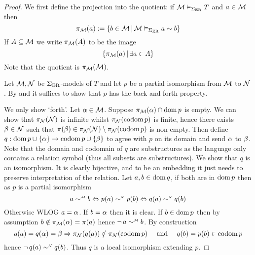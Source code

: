 \begin{proof}
    We first define the projection into the quotient:
    if $\mathcal{M} \vDash_{\Sigma_{\mathrm{ER}}} T$ and $a \in {\mathcal{M}}$ then 
    \[\pi_{\mathcal{M}}(a) := \left\{b \in {\mathcal{M}} \,|\, \mathcal{M} \vDash_{\Sigma_{\mathrm{ER}}} a \sim b\right\}\]
    If $A \subseteq \mathcal{M}$ we write $\pi_{\mathcal{M}}(A)$ to be the image
    \[\left\{\pi_{\mathcal{M}}(a) \,|\, \exists a \in A\right\}\]
    Note that the quotient is $\pi_{\mathcal{M}}(\mathcal{M})$.

    Let $\mathcal{M}, \mathcal{N}$ be $\Sigma_{\mathrm{ER}}$-models of $T$
    and let $p$ be a partial isomorphism from $\mathcal{M}$ to $\mathcal{N}$.
    By  and 
    it suffices to show that $p$ has the back and forth property.
    
    We only show `forth'.
    Let $\alpha \in \mathcal{M}$.
    Suppose $\pi_{\mathcal{M}}(\alpha) \cap \operatorname{dom} p$ is empty.
    We can show that $\pi_{\mathcal{N}}(\mathcal{N})$ is infinite whilst 
    $\pi_{\mathcal{N}}(\operatorname{codom} p)$ is finite, 
    hence there exists $\beta \in \mathcal{N}$ such that 
    $\pi(\beta) \in \pi_{\mathcal{N}}(\mathcal{N}) \setminus \pi_{\mathcal{N}}(\operatorname{codom} p)$ is non-empty.
    Then define $q : \operatorname{dom} p \cup \left\{\alpha\right\} \to \operatorname{codom} p \cup \left\{\beta\right\}$
    to agree with $p$ on its domain and send $\alpha$ to $\beta$.
    Note that the domain and codomain of $q$ are substructures
    as the language only contains a relation symbol 
    (thus all subsets are substructures).
    We show that $q$ is an isomorphism.
    It is clearly bijective, and to be an embedding it just needs to preserve
    interpretation of the relation.
    Let $a,b \in \operatorname{dom} q$, if 
    both are in $\operatorname{dom} p$ then as $p$ is a partial isomorphism
    \[a \modintp{\MM}{\sim} b \iff p(a) \modintp{\NN}{\sim} p(b) \iff 
    q(a) \nnintp{\sim} q(b)\]
    Otherwise WLOG $a = \alpha$.
    If $b = \alpha$ then it is clear.
    If $b \in \operatorname{dom} p$ then by assumption $b \notin \pi_{\mathcal{M}}(\alpha) = \pi(a)$
    hence $\NOT a \mmintp{\sim} b$.
    By construction 
    \[q(a) = q(\alpha) = \beta \Rightarrow 
    \pi_{\mathcal{N}}(q(a)) \notin \pi_{\mathcal{N}}(\operatorname{codom} p) \quad \text{ and } \quad
    q(b) = p(b) \in \operatorname{codom} p\]
    hence $\NOT q(a) \nnintp{\sim} q(b)$.
    Thus $q$ is a local isomorphism extending $p$.


\end{proof}

